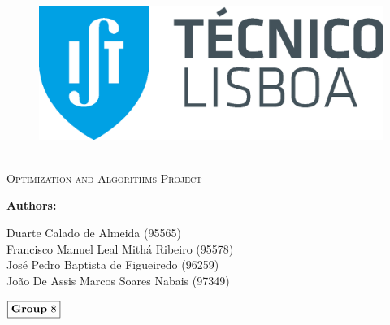\documentclass[12pt]{article}
\newcommand{\HRule}{\rule{\linewidth}{0.5mm}} %
\begin{document}
\begin{center}
    \begin{figure}
        \vspace{-1.0cm}
        \includegraphics[scale = 0.3, left]{Images/IST_A.eps} %
    \end{figure}
    \mbox{}\\[2.0cm]
    \textsc{\Huge Optimization and Algorithms Project}\\[2.5cm]
\end{center}

\begin{flushleft}
    \textbf{Authors:}
\end{flushleft}

\begin{center}
    \begin{minipage}{0.5\textwidth}
        \begin{flushleft}
            Duarte Calado de Almeida (95565)\\
            Francisco Manuel Leal Mithá Ribeiro (95578)\\
            José Pedro Baptista de Figueiredo (96259) \\
            João De Assis Marcos Soares Nabais (97349)\\ 
        \end{flushleft}
    \end{minipage}%
\end{center}
    
\begin{flushleft}
    \large $\boxed{\text{\bf Group} \ 8}$\\[4.0cm]
\end{flushleft}
    
\end{document}
